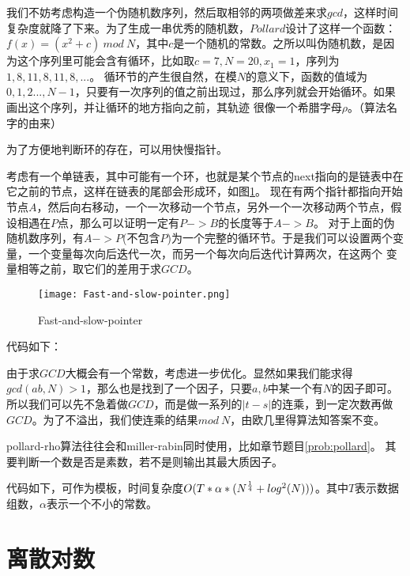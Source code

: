 我们不妨考虑构造一个伪随机数序列，然后取相邻的两项做差来求$gcd$，这样时间复杂度就降了下来。{\heiti 为了生成一串优秀的随机数}，$Pollard$设计了这样一个函数：
$f(x) = (x^2+c)  \ mod\ N$，其中$c$是一个随机的常数。之所以叫伪随机数，是因为这个序列里可能会含有循环，比如取$c=7, N=20, x_1=1$，序列为$1,8,11,8,11,8,...$。
循环节的产生很自然，在模$N$的意义下，函数的值域为$0,1,2...,N-1$，只要有一次序列的值之前出现过，那么序列就会开始循环。如果画出这个序列，并让循环的地方指向之前，其轨迹
很像一个希腊字母$\rho$。（算法名字的由来）

为了方便地判断环的存在，可以用{\heiti 快慢指针}。

考虑有一个单链表，其中可能有一个环，也就是某个节点的next指向的是链表中在它之前的节点，这样在链表的尾部会形成环，如图\ref{fig:Fast-and-slow-pointer}。
现在有两个指针都指向开始节点$A$，然后向右移动，一个一次移动一个节点，另外一个一次移动两个节点，假设相遇在$P$点，那么可以证明一定有$P->B$的长度等于$A->B$。
对于上面的伪随机数序列，有$A->P$(不包含$P$)为一个完整的循环节。于是我们可以设置两个变量，一个变量每次向后迭代一次，而另一个每次向后迭代计算两次，在这两个
变量相等之前，取它们的差用于求$GCD$。

\begin{figure}[htbp]
	\centering
	\texttt{[image: Fast-and-slow-pointer.png]}
	\caption{Fast-and-slow-pointer \label{fig:Fast-and-slow-pointer}}
\end{figure}

代码如下：


由于求$GCD$大概会有一个常数，考虑进一步优化。显然如果我们能求得$gcd(ab,N)>1$，那么也是找到了一个因子，只要$a,b$中某一个有$N$的因子即可。
所以我们可以先不急着做$GCD$，而是做一系列的$|t-s|$的连乘，到一定次数再做$GCD$。为了不溢出，我们使连乘的结果$mod\ N$，由欧几里得算法知答案不变。



pollard-rho算法往往会和miller-rabin同时使用，比如章节题目\ref{prob:pollard}。
其要判断一个数是否是素数，若不是则输出其最大质因子。

代码如下，可作为模板，时间复杂度$O(T*\alpha*(N^{1\over 4}+log^2(N)))$。其中$T$表示数据组数，$\alpha$表示一个不小的常数。



\section{离散对数}

